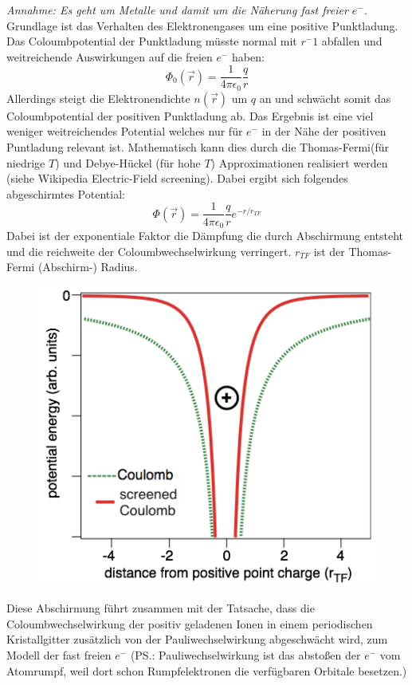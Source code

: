 \label{q:39}
\textit{Annahme: Es geht um Metalle und damit um die Näherung fast freier $e^-$.}\\
Grundlage ist das Verhalten des Elektronengases um eine positive Punktladung.
Das Coloumbpotential der Punktladung müsste normal mit $r^-1$ abfallen und weitreichende Auswirkungen auf die freien $e^-$ haben:
\begin{equation*}
    \Phi_0(\vec{r}) = \frac{1}{4 \pi \epsilon_0}\frac{q}{r}
\end{equation*}
Allerdings steigt die Elektronendichte $n(\vec{r})$ um $q$ an und schwächt somit das Coloumbpotential der positiven Punktladung ab.
Das Ergebnis ist eine viel weniger weitreichendes Potential welches nur für $e^-$ in der Nähe der positiven Puntladung relevant ist.
Mathematisch kann dies durch die Thomas-Fermi(für niedrige $T$) und Debye-Hückel (für hohe $T$) Approximationen realisiert werden (siehe Wikipedia Electric-Field screening).
Dabei ergibt sich folgendes abgeschirmtes Potential:
\begin{equation*}
    \Phi(\vec{r}) = \frac{1}{4 \pi \epsilon_0}\frac{q}{r} e^{-r / r_{TF}}
\end{equation*}
Dabei ist der exponentiale Faktor die Dämpfung die durch Abschirmung entsteht und die reichweite der Coloumbwechselwirkung verringert.
$r_{TF}$ ist der Thomas-Fermi (Abschirm-) Radius.
\begin{figure}[H]
    \centering
    \includegraphics[width=0.3\linewidth]{resources/15-06-2015/q39_pot.png}
\end{figure}
\noindent
Diese Abschirmung führt zusammen mit der Tatsache, dass die Coloumbwechselwirkung der positiv geladenen Ionen in einem periodischen Kristallgitter zusätzlich von der Pauliwechselwirkung abgeschwächt wird, zum Modell der fast freien $e^-$
(PS.: Pauliwechselwirkung ist das abstoßen der $e^-$ vom Atomrumpf, weil dort schon Rumpfelektronen die verfügbaren Orbitale besetzen.)
\label{q:40}

